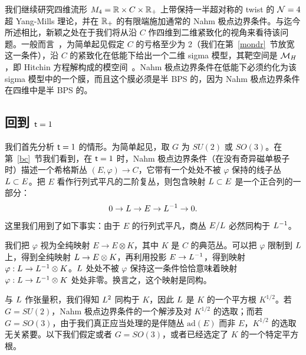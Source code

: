 我们继续研究四维流形 $M_4={\mathbb R}\times C\times {\mathbb R}_+$ 上带保持一半超对称的 twist 的 ${\mathcal N}=4$ 超 Yang-Mills 理论，并在 ${\mathbb R}_+$ 的有限端施加通常的 Nahm 极点边界条件。与迄今所述相比，新颖之处在于我们将从沿 $C$ 作四维到二维紧致化的视角来看待该问题。一般而言~\cite{BVJ,HM}，为简单起见假定 $C$ 的亏格至少为 2（我们在第~\ref{mondr}~节放宽这一条件），沿 $C$ 的紧致化在低能下给出一个二维 sigma 模型，其靶空间是 ${\mathcal M}_H$，即 Hitchin 方程解构成的模空间~\cite{Hitchin}。Nahm 极点边界条件在低能下必须约化为该 sigma 模型中的一个膜，而且这个膜必须是半 BPS 的，因为 Nahm 极点边界条件在四维中是半 BPS 的。



\subsection{回到 ${ \sf t}=1$}\label{tone}

我们首先分析 ${ \sf t}=1$ 的情形。为简单起见，取 $G$ 为 $SU(2)$ 或 $SO(3)$。在第~\ref{bc}~节我们看到，在 ${ \sf t}=1$ 时，Nahm 极点边界条件（在没有奇异磁单极子时）描述一个希格斯丛 $(E,\varphi)\to C$，它带有一个处处不被 $\varphi$ 保持的线子丛 ${ L}\subset E$。把 $E$ 看作行列式平凡的二阶复丛，则包含映射 ${ L}\subset E$ 是一个正合列的一部分：
\begin{equation}\label{exacto} 0 \to { L}\to E\to { L}^{-1}\to 0.\end{equation}
这里我们用到了如下事实：由于 $E$ 的行列式平凡，商丛 $E/{ L}$ 必然同构于 ${ L}^{-1}$。

我们把 $\varphi$ 视为全纯映射 $E\to E\otimes K$，其中 $K$ 是 $C$ 的典范丛。可以把 $\varphi$ 限制到 ${ L}$ 上，得到全纯映射 ${ L}\to E\otimes K$，再利用投影 $E\to { L}^{-1}$，得到映射 $\varphi:{ L}\to { L}^{-1}\otimes K$。${ L}$ 处处不被 $\varphi$ 保持这一条件恰恰意味着映射 $\varphi:{ L}\to { L}^{-1}\otimes K$ 处处非零。换言之，这个映射是同构。

与 ${ L}$ 作张量积，我们得知 ${ L}^2$ 同构于 $K$，因此 ${ L}$ 是 $K$ 的一个平方根 $K^{1/2}$。若 $G=SU(2)$，Nahm 极点边界条件的一个解涉及对 $K^{1/2}$ 的选取；而若 $G=SO(3)$，由于我们真正应当处理的是伴随丛 $\mathrm{ad}(E)$ 而非 $E$，$K^{1/2}$ 的选取无关紧要。以下我们假定或者 $G=SO(3)$，或者已经选定了 $K$ 的一个特定平方根。

